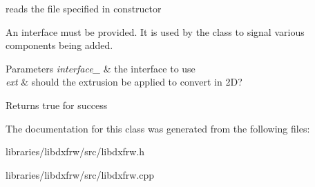 reads the file specified in constructor 

An interface must be provided. It is used by the class to signal various components being added. 
\begin{DoxyParams}{Parameters}
{\em interface\-\_\-} & the interface to use \\
\hline
{\em ext} & should the extrusion be applied to convert in 2\-D? \\
\hline
\end{DoxyParams}
\begin{DoxyReturn}{Returns}
true for success 
\end{DoxyReturn}


The documentation for this class was generated from the following files\-:\begin{DoxyCompactItemize}
\item 
libraries/libdxfrw/src/libdxfrw.\-h\item 
libraries/libdxfrw/src/libdxfrw.\-cpp\end{DoxyCompactItemize}

